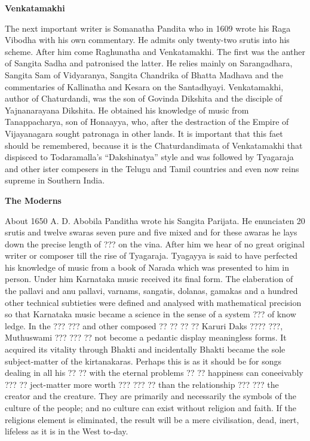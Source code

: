 \documentclass{book}
\begin{document}
\begin{center}
\textbf{Venkatamakhi}
\end{center}

The next important writer is Somanatha Pandita who in 1609 wrote his
Raga Vibodha with his own commentary. He admits only twenty-two srutis
into his scheme. After him come Raghunatha and Venkatamakhi. The first
was the anther of Sangita Sadha and patronised the latter. He relies
mainly on Sarangadhara, Sangita Sam of Vidyaranya, Sangita Chandrika
of Bhatta Madhava and the commentaries of Kallinatha and Kesara on the
Santadhyayi. Venkatamakhi, author of Chaturdandi, was the son of
Govinda Dikshita and the disciple of Yajnanarayana Dikshita. He
obtained his knowledge of music from Tanappacharya, son of Honaayya,
who, after the destraction of the Empire of Vijayanagara sought
patronaga in other lands. It is important that this faet should be
remembered, because it is the Chaturdandimata of Venkatamakhi that
dispisced to Todaramalla's ``Dakshinatya'' style and was followed by
Tyagaraja and other ister  compesers in the Telugu and Tamil countries
and even now reins supreme in Southern India.

\begin{center}
\textbf{The Moderns}
\end{center}

About 1650 A. D. Abobila Panditha wrote his Sangita Parijata. He
enunciaten 20 srutis and twelve swaras seven pure and five mixed and
for these awaras he lays down the precise length of ??? on the
vina. After him we hear of no great original writer or composer till
the rise of Tyagaraja. Tyagayya is said to have perfected his
knowledge of music from a book of Narada which was presented to him in
person. Under him Karnataka music received its final form.  The
elaberation of the pallavi and anu pallavi, varnams, sangatis,
dolanas, gamakas and a hundred other technical subtieties were defined
and analysed with mathematical precision so that Karnataka music
became a science in the sense of a system ??? of know ledge. In the
??? ??? and other composed ?? ?? ?? ?? Karuri Daks ???? ???,
Muthuswami ??? ??? ??  not become a pedantic display meaningless
forms. It acquired its vitality through Bhakti and incidentally Bhakti
became the sole subject-matter of the kirtanakaras. Perhaps this is as
it should be for songs dealing in all his ?? ?? with the eternal
problems ?? ?? happiness can coneeivably ???  ??  ject-matter more
worth ??? ??? ?? than the relationship ??? ??? the creator and the
creature. They are primarily and necessarily the symbols of the
culture of the people; and no culture can exist without religion and
faith. If the religions element is eliminated, the result will be a
mere civilisation, dead, inert, lifeless as it is in the West to-day.
\end{document}
